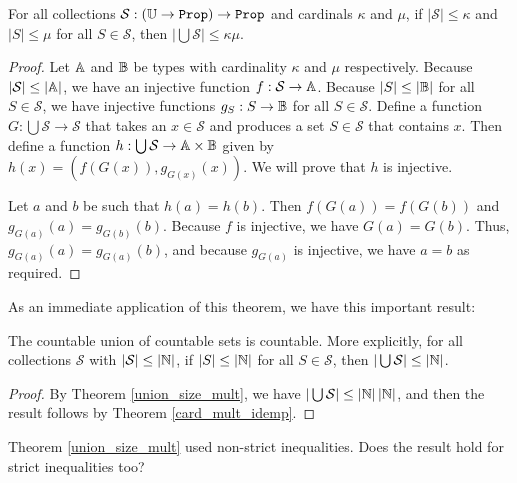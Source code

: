 \documentclass[../../math.tex]{subfiles}
\begin{document}
\begin{theorem} \label{union_size_mult}
    For all collections $\mathcal S : (\U \to \Prop) \to \Prop$ and cardinals
    $\kappa$ and $\mu$, if $|\mathcal S| \leq \kappa$ and $|S| \leq \mu$ for all
    $S \in \mathcal S$, then $|\bigcup \mathcal S| \leq \kappa\mu$.
\end{theorem}
\begin{proof}
    Let $\mathbb{A}$ and $\mathbb{B}$ be types with cardinality $\kappa$ and $\mu$ respectively.
    Because $|\mathcal S| \leq |\mathbb{A}|$, we have an injective function $f :
    \mathcal S \to \mathbb{A}$.  Because $|S| \leq |\mathbb{B}|$ for all $S \in \mathcal S$, we
    have injective functions $g_S : S \to \mathbb{B}$ for all $S \in \mathcal S$.
    Define a function $G : \bigcup \mathcal S \to \mathcal S$ that takes an $x
    \in \mathcal S$ and produces a set $S \in \mathcal S$ that contains $x$.
    Then define a function $h : \bigcup \mathcal S \to \mathbb{A} \times \mathbb{B}$ given by
    $h(x) = (f(G(x)), g_{G(x)}(x))$.  We will prove that $h$ is injective.

    Let $a$ and $b$ be such that $h(a) = h(b)$.  Then $f(G(a)) = f(G(b))$ and
    $g_{G(a)}(a) = g_{G(b)}(b)$.  Because $f$ is injective, we have $G(a) =
    G(b)$.  Thus, $g_{G(a)}(a) = g_{G(a)}(b)$, and because $g_{G(a)}$ is
    injective, we have $a = b$ as required.
\end{proof}

As an immediate application of this theorem, we have this important result:

\begin{theorem} \label{countable_union_countable}
    The countable union of countable sets is countable.  More explicitly, for
    all collections $\mathcal S$ with $|\mathcal S| \leq |\mathbb{N}|$, if $|S| \leq
    |\mathbb{N}|$ for all $S \in \mathcal S$, then $|\bigcup \mathcal S| \leq |\mathbb{N}|$.
\end{theorem}
\begin{proof}
    By Theorem \ref{union_size_mult}, we have $|\bigcup \mathcal S| \leq
    |\mathbb{N}|\,|\mathbb{N}|$, and then the result follows by Theorem \ref{card_mult_idemp}.
\end{proof}

Theorem \ref{union_size_mult} used non-strict inequalities.  Does the result
hold for strict inequalities too?
\end{document}
